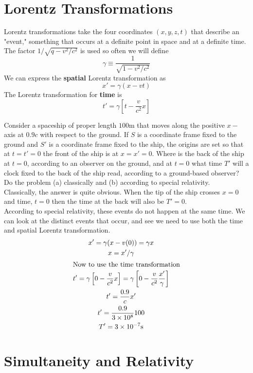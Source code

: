 \section{Lorentz Transformations}
Lorentz transformations take the four coordinates $ (x,y,z,t) $ that describe an "event," something that occurs at a definite point in space and at a definite time. \\ 
The factor $ 1/\sqrt{q - v^2 /c^2} $ is used so often we will define
\[ \gamma  \equiv \dfrac{1}{\sqrt{1-v^2/c^2}} \]
We can express the \textbf{spatial} Lorentz transformation as
\[ x' = \gamma (x-vt) \]
The Lorentz transformation for \textbf{time} is
\[ t' = \gamma \left[t - \dfrac{v}{c^2}x\right] \]
\begin{example}
	Consider a spaceship of proper length $ 100 $m that moves along the positive $ x- $axis at $ 0.9c $ with respect to the ground. If $ S $ is a coordinate frame fixed to the ground and $ S' $ is a coordinate frame fixed to the ship, the origins are set so that at $ t = t' = 0$ the front of the ship is at $ x = x' =0 $. Where is the back of the ship at $ t = 0 $, according to an observer on the ground, and at $ t = 0 $ what time $ T' $ will a clock fixed to the back of the ship read, according to a ground-based observer? Do the problem (a) classically and (b) according to special relativity.  \\
	Classically, the answer is quite obvious. When the tip of the ship crosses $ x = 0 $ and time, $ t = 0 $ then the time at the back will also be $ T' =0 $. \\
	According to special relativity, these events do not happen at the same time. We can look at the distinct events that occur, and see we need to use both the time and spatial Lorentz transformation. 
	\begin{gather*}
		x' = \gamma(x-v(0))= \gamma x \\
		x = x'/\gamma \\
		\intertext{Now to use the time transformation}
		t' = \gamma\left[0 - \dfrac{v}{c^2}x\right] = \gamma\left[0 - \dfrac{v}{c^2} \dfrac{x'}{\gamma}\right] \\
		t' = \dfrac{0.9}{c} x' \\
		t' = \dfrac{0.9}{3 \times 10^{8}} 100 \\
		T' = 3 \times 10^{-7} \mbox{s}
	\end{gather*}
\end{example}
\section{Simultaneity and Relativity}